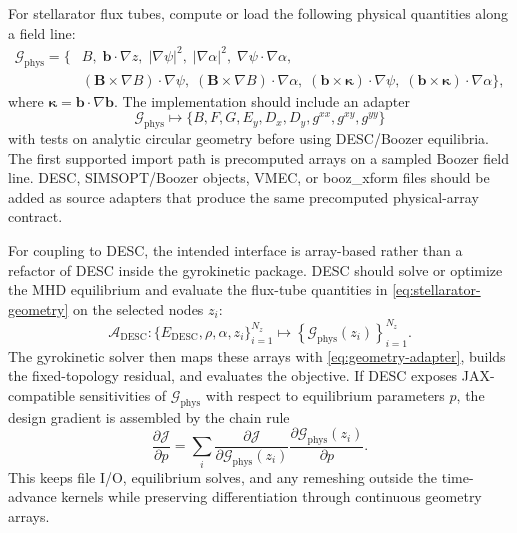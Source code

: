 \documentclass[11pt,a4paper]{article}
\newcommand{\bvec}{\bm b}
\newcommand{\Bvec}{\bm B}
\newcommand{\grad}{\nabla}
\begin{document}
For stellarator flux tubes, compute or load the following physical quantities along a field line:
\begin{equation}
\begin{split}
  \mathcal{G}_{\mathrm{phys}} =
  \{&
  B,\;
  \bvec\cdot\grad z,\;
  |\grad \psi|^2,\;
  |\grad \alpha|^2,\;
  \grad\psi\cdot\grad\alpha, \\
  &(\Bvec\times\grad B)\cdot\grad\psi,\;
  (\Bvec\times\grad B)\cdot\grad\alpha,\;
  (\bvec\times\bm\kappa)\cdot\grad\psi,\;
  (\bvec\times\bm\kappa)\cdot\grad\alpha
  \},
  \label{eq:stellarator-geometry}
\end{split}
\end{equation}
where \(\bm\kappa=\bvec\cdot\grad\bvec\).  The implementation should include an adapter
\begin{equation}
  \mathcal{G}_{\mathrm{phys}}
  \longmapsto
  \{B,F,G,E_y,D_x,D_y,g^{xx},g^{xy},g^{yy}\}
  \label{eq:geometry-adapter}
\end{equation}
with tests on analytic circular geometry before using DESC/Boozer equilibria.
The first supported import path is precomputed arrays on a sampled Boozer
field line.  DESC, SIMSOPT/Boozer objects, VMEC, or booz\_xform files should be
added as source adapters that produce the same precomputed physical-array
contract.

For coupling to DESC, the intended interface is array-based rather than a
refactor of DESC inside the gyrokinetic package.  DESC should solve or optimize
the MHD equilibrium and evaluate the flux-tube quantities in
\eqref{eq:stellarator-geometry} on the selected nodes \(z_i\):
\begin{equation}
  \mathcal{A}_{\mathrm{DESC}}
  \colon
  \{E_{\mathrm{DESC}},\rho,\alpha,z_i\}_{i=1}^{N_z}
  \longmapsto
  \left\{\mathcal{G}_{\mathrm{phys}}(z_i)\right\}_{i=1}^{N_z}.
  \label{eq:desc-array-adapter}
\end{equation}
The gyrokinetic solver then maps these arrays with
\eqref{eq:geometry-adapter}, builds the fixed-topology residual, and evaluates
the objective.  If DESC exposes JAX-compatible sensitivities of
\(\mathcal{G}_{\mathrm{phys}}\) with respect to equilibrium parameters \(p\),
the design gradient is assembled by the chain rule
\begin{equation}
  \frac{\partial \mathcal{J}}{\partial p}
  =
  \sum_i
  \frac{\partial \mathcal{J}}{\partial \mathcal{G}_{\mathrm{phys}}(z_i)}
  \frac{\partial \mathcal{G}_{\mathrm{phys}}(z_i)}{\partial p}.
  \label{eq:desc-chain-rule}
\end{equation}
This keeps file I/O, equilibrium solves, and any remeshing outside the
time-advance kernels while preserving differentiation through continuous
geometry arrays.
\end{document}
